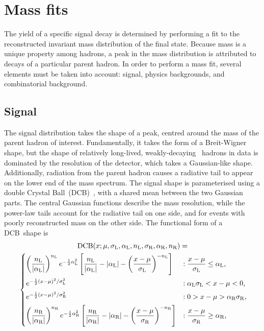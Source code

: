 \section{Mass fits}
\label{sec:MassFits}

The yield of a specific signal decay is determined by performing a fit to the reconstructed invariant mass distribution of the final state.
Because mass is a unique property among hadrons, a peak in the mass distribution is attributed to decays of a particular parent hadron.
In order to perform a mass fit, several elements must be taken into account: signal, physics backgrounds, and combinatorial background.

\subsection{Signal}
\label{sec:MassFits_Signal}
The signal distribution takes the shape of a peak, centred around the mass of the parent hadron of interest.
Fundamentally, it takes the form of a Breit-Wigner shape, but the shape of relatively long-lived, weakly-decaying \bquark~hadrons in data is dominated by the resolution of the detector, which takes a Gaussian-like shape.
Additionally, radiation from the parent hadron causes a radiative tail to appear on the lower end of the mass spectrum.
The signal shape is parameterised using a double Crystal Ball~(DCB)~\cite{Skwarnicki:1986xj}, with a shared mean between the two Gaussian parts.
The central Gaussian functions describe the mass resolution, while the power-law tails account for the radiative tail on one side, and for events with poorly reconstructed mass on the other side.
The functional form of a DCB~shape is
%
\begin{multline} \label{eqn:Methods_DCB}
    \DCB(x; \DCBmu, \DCBsL, \DCBaL, \DCBnL, \DCBsR, \DCBaR, \DCBnR) = \\
    \begin{cases}
        \left(\dfrac{\DCBnL}{|\DCBaL|}\right)^{\DCBnL} e^{-\frac{1}{2}\DCBaL^2} \left[\dfrac{\DCBnL}{|\DCBaL|} - |\DCBaL| - \left(\dfrac{x - \DCBmu}{\DCBsL}\right)^{-\DCBnL}\right] &: \dfrac{x - \DCBmu}{\DCBsL} \leq \DCBaL \rlap{,} \\[3ex]
        e^{-\frac{1}{2} (x - \DCBmu)^2 / \DCBsL^2} &: \DCBaL\DCBsL < x - \DCBmu < 0 \rlap{,} \\[1ex]
        e^{-\frac{1}{2} (x - \DCBmu)^2 / \DCBsR^2} &: 0 > x - \DCBmu > \DCBaR\DCBsR \rlap{,} \\[1ex]
        \left(\dfrac{\DCBnR}{|\DCBaR|}\right)^{\DCBnR} e^{-\frac{1}{2}\DCBaR^2} \left[\dfrac{\DCBnR}{|\DCBaR|} - |\DCBaR| - \left(\dfrac{x - \DCBmu}{\DCBsR}\right)^{-\DCBnR}\right] &: \dfrac{x - \DCBmu}{\DCBsR} \geq \DCBaR \rlap{,}
    \end{cases}
\end{multline}
